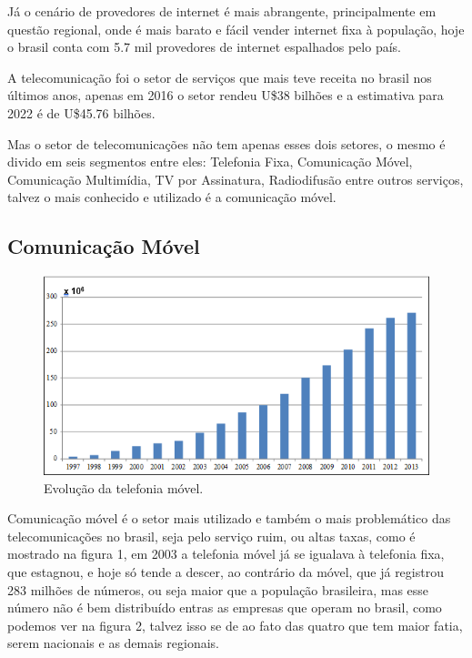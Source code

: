 \documentclass{sbrt2018port}
\begin{document}
Já o cenário de provedores de internet é mais abrangente, principalmente em questão regional, onde é mais barato e fácil vender internet fixa à população, hoje o brasil conta com 5.7 mil provedores de internet espalhados pelo país.

A telecomunicação foi o setor de serviços que mais teve receita no brasil nos últimos anos, apenas em 2016 o setor rendeu U\$38 bilhões e a estimativa para 2022 é de U\$45.76 bilhões.

Mas o setor de telecomunicações não tem apenas esses dois setores, o mesmo é divido em seis segmentos entre eles: Telefonia Fixa, Comunicação Móvel, Comunicação Multimídia, TV por Assinatura, Radiodifusão entre outros serviços, talvez o mais conhecido e utilizado é a comunicação móvel.

\subsection{Comunicação Móvel}
\label{s_segmento}

\begin{figure}[!ht]%
    \centering
    \includegraphics[width=\linewidth]{grafico.png}
    \caption{Evolução da telefonia móvel.}
    \label{f_cerd2}
\end{figure}

Comunicação móvel é o setor mais utilizado e também o mais problemático das telecomunicações no brasil, seja pelo serviço ruim, ou altas taxas, como é mostrado na figura 1, em 2003 a telefonia móvel já se igualava à telefonia fixa, que estagnou, e hoje só tende a descer, ao contrário da móvel, que já registrou 283 milhões de números, ou seja maior que a população brasileira, mas esse número não é bem distribuído entras as empresas que operam no brasil, como podemos ver na figura 2, talvez isso se de ao fato das quatro que tem maior fatia, serem nacionais e as demais regionais.
\end{document}
